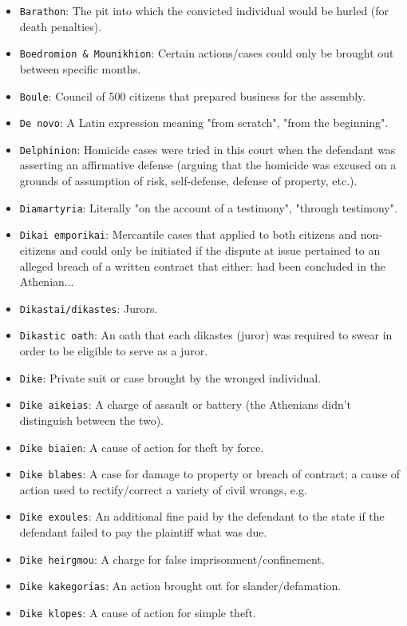 \documentclass[11pt]{article}
\begin{document}
\begin{itemize}
\item \texttt{Barathon}: The pit into which the convicted individual would be hurled (for death penalties).
\item \texttt{Boedromion \& Mounikhion}: Certain actions/cases could only be brought out between specific months.
\item \texttt{Boule}: Council of 500 citizens that prepared business for the assembly.
\item \texttt{De novo}: A Latin expression meaning "from scratch", "from the beginning".
\item \texttt{Delphinion}: Homicide cases were tried in this court when the defendant was asserting an affirmative defense (arguing that the homicide was excused on a grounds of assumption of risk, self-defense, defense of property, etc.).
\item \texttt{Diamartyria}: Literally "on the account of a testimony", "through testimony".
\item \texttt{Dikai emporikai}: Mercantile cases that applied to both citizens and non-citizens and could only be initiated if the dispute at issue pertained to an alleged breach of a written contract that either: had been concluded in the Athenian...
\item \texttt{Dikastai/dikastes}: Jurors.
\item \texttt{Dikastic oath}: An oath that each dikastes (juror) was required to swear in order to be eligible to serve as a juror.
\item \texttt{Dike}: Private suit or case brought by the wronged individual.
\item \texttt{Dike aikeias}: A charge of assault or battery (the Athenians didn't distinguish between the two).
\item \texttt{Dike biaien}: A cause of action for theft by force.
\item \texttt{Dike blabes}: A case for damage to property or breach of contract; a cause of action used to rectify/correct a variety of civil wrongs, e.g.
\item \texttt{Dike exoules}: An additional fine paid by the defendant to the state if the defendant failed to pay the plaintiff what was due.
\item \texttt{Dike heirgmou}: A charge for false imprisonment/confinement.
\item \texttt{Dike kakegorias}: An action brought out for slander/defamation.
\item \texttt{Dike klopes}: A cause of action for simple theft.

\end{itemize}
\end{document}

